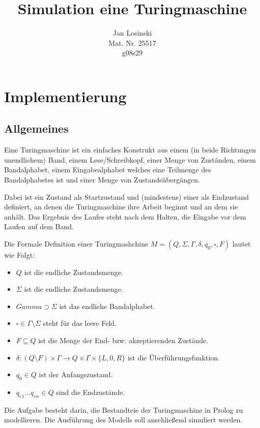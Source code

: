 \documentclass[final,a4paper,11pt,notitlepage,halfparskip]{scrreprt}
\title{Simulation eine Turingmaschine}
\author{Jan Losinski\\
\small{Mat. Nr. 25517}\\
\small{g08s29}}
\begin{document}
\maketitle

\tableofcontents

\chapter{Implementierung}
\section{Allgemeines}
Eine Turingmaschine ist ein einfaches Konstrukt aus einem (in beide 
Richtungen unendlichem) Band, einem Lese/Schreibkopf, einer Menge von
Zuständen, einem Bandalphabet, einem Eingabealphabet welches eine
Teilmenge des Bandalphabetes ist und einer Menge von Zustandsübergängen.

Dabei ist ein Zustand als Startzustand und (mindestens) einer als
Endzustand definiert, an denen die Turingmaschine ihre Arbeit beginnt
und an dem sie anhält. Das Ergebnis des Laufes steht nach dem Halten, 
die Eingabe vor dem Laufen auf dem Band.

Die Formale Definition einer Turingmashchine $M=(Q, \Sigma, \Gamma,
\delta, q_0, \square, F)$ lautet wie Folgt:

\begin{itemize}
    \item  $Q$ ist die endliche Zustandsmenge.
    \item  $\Sigma$ ist die endliche Zustandsmenge.
    \item  $Gamma \supset \Sigma$ ist das endliche Bandalphabet.
    \item  $\square \in \Gamma\setminus\Sigma$ steht für das leere Feld.
    \item  $F \subseteq Q$ ist die Menge der End- bzw. akzeptierenden Zustände.
    \item  $\delta: (Q \setminus F)\times \Gamma \rightarrow Q \times
	\Gamma \times \{ L, 0, R \}$ ist die Überführungsfunktion.
    \item  $q_0 \in Q$ ist der Anfangszustand.  	
    \item  $q_{e1} \dots q_{en} \in Q$ sind die Endzustände.  	
\end{itemize}

Die Aufgabe besteht darin, die Bestandteie der Turingmaschine in Prolog
zu modellieren. Die Ausführung des Modells soll anschließend simuliert
werden.
\end{document}
